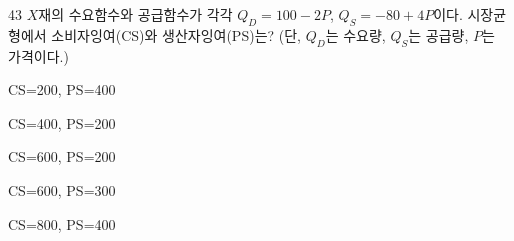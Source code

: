 \begin{question}{43}
$X$재의 수요함수와 공급함수가 각각 $Q_{D}=100-2P$, $Q_{S}=-80+4P$이다. 시장균형에서 소비자잉여(CS)와 생산자잉여(PS)는? (단, $Q_{D}$는 수요량, $Q_{S}$는 공급량, $P$는 가격이다.)
\begin{choices}
  \item CS=200, PS=400
  \item CS=400, PS=200
  \item CS=600, PS=200
  \item CS=600, PS=300
  \item CS=800, PS=400
\end{choices}
\end{question}
